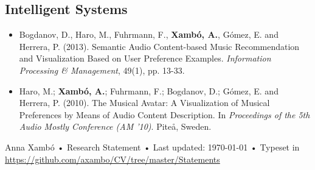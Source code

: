 \documentclass[10pt, a4paper]{article}
\begin{document}
\subsection*{Intelligent Systems}

\begin{itemize}
\item Bogdanov, D., Haro, M., Fuhrmann, F., \textbf{Xambó, A.}, Gómez, E. and Herrera, P. (2013). Semantic Audio Content-based Music Recommendation and Visualization Based on User Preference Examples. \emph{Information Processing \& Management}, 49(1), pp. 13-33.
\item Haro, M.; \textbf{Xambó, A.}; Fuhrmann, F.; Bogdanov, D.; Gómez, E. and Herrera, P. (2010). The Musical Avatar: A Visualization of Musical Preferences by Means of Audio Content Description. In \emph{Proceedings of the 5th Audio Mostly Conference (AM '10)}. Piteå, Sweden.
\end{itemize}

\vfill{}

\begin{center}
{\scriptsize  Anna Xambó •\- Research Statement •\- Last updated: \today\- •\- %
Typeset in \href{http://nitens.org/taraborelli/cvtex}{
\XeTeX }\\

\href{https://github.com/axambo/CV/tree/master/Statements}{https://github.com/axambo/CV/tree/master/Statements}}
\end{center}
\end{document}
